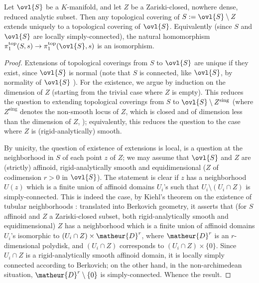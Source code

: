 \begin{pro}\label{pro::1.1.3}
 Let $\ovl{S}$ be a $K$-manifold, and let $Z$ be a Zariski-closed,
 nowhere dense, reduced analytic subset. Then any topological covering
 of $S:=\ovl{S}\setminus Z$ extends uniquely to a topological covering of
 $\ovl{S}$. Equivalently (since $S$ and $\ovl{S}$ are locally
 simply-connected), the natural homomorphism $\pi_1^{\mathrm{top}}(S,s)\to
 \pi_1^{\mathrm{top}}(\ovl{S},s)$ is an isomorphism.
\end{pro}
\begin{proof}
 Extensions of topological coverings from $S$ to $\ovl{S}$ are unique if
 they exist, since $\ovl{S}$ is normal (note that $S$ is connected, 
 like $\ovl{S}$, by normality of $\ovl{S}$ \cite[3.3.16]{staagonf}).
 For the existence, we argue by induction on the dimension of $Z$
 (starting from the trivial case where $Z$ is empty).  This reduces the
 question to extending topological coverings from $S$ to $\ovl{S}\setminus
 Z^{\mathrm{sing}}$ (where $Z^{\mathrm{sing}}$ denotes the non-smooth
 locus of $Z$, which 
 is closed and of dimension less than the dimension of $Z$, \cf 
 \cite[2.2]{ecfnas}); equivalently, this reduces the question to the case
 where $Z$ is (rigid-analytically) smooth.

 By unicity, the question of existence of extensions is local, \ie is a
 question at the neighborhood in $S$ of each point $z$ of $Z$; we may
 assume that $\ovl{S}$ and $Z$ are (strictly) affinoid,
 rigid-analytically smooth and equidimensional ($Z$ of codimension $r>0$
 in $\ovl{S}$). The statement is clear if $z$ has a neighborhood $U(z)$
 which is a finite union of affinoid domains $U_i$'s such that
 $U_i\setminus (U_i\cap Z)$ is simply-connected. This is indeed the
 case, by Kiehl's theorem on the existence of tubular neighborhoods
 \cite{defeaidnf}: translated into Berkovich geometry, it asserts that (for
 $S$ affinoid and $Z$ a Zariski-closed subset, both rigid-analytically
 smooth and equidimensional) $Z$ has a neighborhood which is a finite
 union of affinoid domains $U_i$'s isomorphic to $(U_i \cap Z)\times
 \matheur{D}^r$, where $\matheur{D}^r$ is an $r$-dimensional polydisk,
 and $ (U_i\cap Z)$ corresponds to $(U_i \cap Z)\times \{0\}.$ Since
 $U_i\cap Z$ is a rigid-analytically smooth affinoid domain, it is
 locally simply connected according to Berkovich; on the other hand, in the
 non-archimedean situation, $\matheur{D}^r\setminus \{0\}$ is
 simply-connected. Whence the result.
\end{proof}


